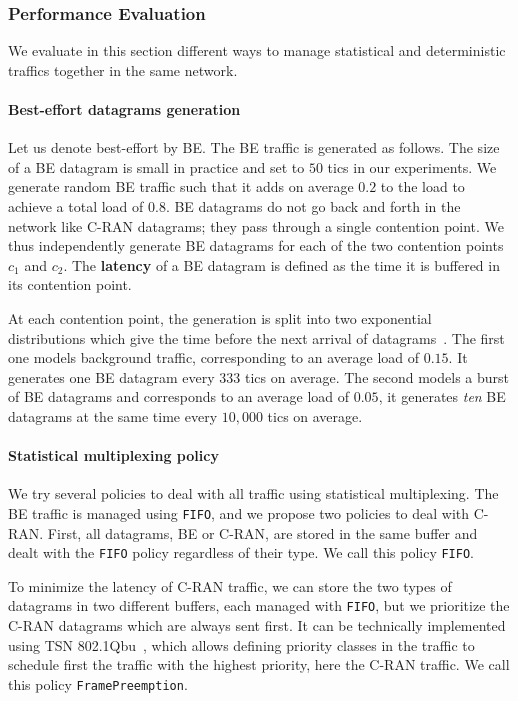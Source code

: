 \documentclass[a4paper,10pt]{journal}
\newcommand\FIFO{\texttt{FIFO}\xspace}
\newcommand\framepre{\texttt{FramePreemption}\xspace}
\begin{document}
    \subsubsection{Performance Evaluation}
    
    We evaluate in this section different ways to manage statistical and deterministic traffics together in the same network.
 
    \paragraph{Best-effort datagrams generation}
  Let us denote best-effort by BE. The BE traffic is generated as follows. The size of a BE datagram is small in practice and set to $50$ tics in our experiments. We generate random BE traffic such that it adds on average $0.2$ to the load to achieve a total load of $0.8$. BE datagrams do not go back and forth in the network like C-RAN datagrams; they pass through a single contention point.
We thus independently generate BE datagrams for each of the two contention points $c_1$ and $c_2$. The \textbf{latency} of a BE datagram is defined as the time it is buffered in its contention point.

At each contention point, the generation is split into two exponential distributions which give the time before the next arrival of datagrams~\cite{el2018performance}. The first one models background traffic, corresponding to an average load of $0.15$. It generates one BE datagram every $333$ tics on average. The second models a burst of BE datagrams and corresponds to an average load of $0.05$, it generates \emph{ten} BE datagrams at the same time every $10,000$ tics on average.

   	\paragraph{Statistical multiplexing policy}

    We try several policies to deal with all traffic using statistical multiplexing.
   	The BE traffic is managed using \FIFO, and we propose two policies to deal with C-RAN. First, all datagrams, BE or C-RAN, are stored in the same buffer and dealt with the \FIFO policy regardless of their type. We call this policy \FIFO.

    To minimize the latency of C-RAN traffic, we can store the two types of datagrams in two different buffers, each managed with \FIFO, but we prioritize the C-RAN datagrams which are always sent first. It can be technically implemented using TSN 802.1Qbu~\cite{ieee802}, which allows defining priority classes in the traffic to schedule first the traffic with the highest priority, here the C-RAN traffic. We call this policy \framepre.
   
\end{document}
